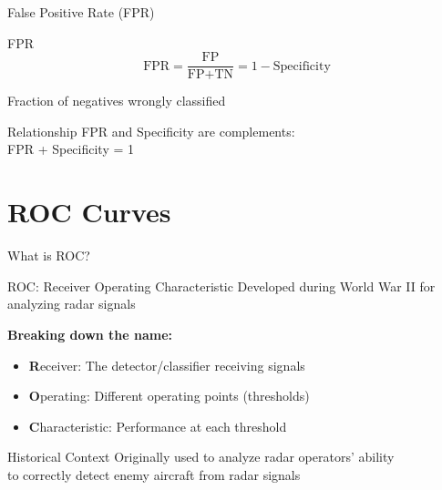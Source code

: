 \documentclass{beamer}
\begin{document}
\begin{frame}{False Positive Rate (FPR)}
\begin{definitionbox}{FPR}
\small
$$\text{FPR} = \frac{\text{FP}}{\text{FP} + \text{TN}} = 1 - \text{Specificity}$$

\vspace{0.15cm}

Fraction of negatives wrongly classified
\end{definitionbox}

\vspace{0.2cm}

\begin{keypointsbox}{Relationship}
\small
FPR and Specificity are complements: \\
FPR + Specificity = 1
\end{keypointsbox}
\end{frame}

\section{ROC Curves}

\begin{frame}{What is ROC?}
\begin{definitionbox}{ROC: Receiver Operating Characteristic}
\small
Developed during World War II for analyzing radar signals

\vspace{0.15cm}

\textbf{Breaking down the name:}
\begin{itemize}
    \item \textbf{R}eceiver: The detector/classifier receiving signals
    \item \textbf{O}perating: Different operating points (thresholds)
    \item \textbf{C}haracteristic: Performance at each threshold
\end{itemize}
\end{definitionbox}

\vspace{0.15cm}

\begin{keypointsbox}{Historical Context}
\small
Originally used to analyze radar operators' ability \\
to correctly detect enemy aircraft from radar signals
\end{keypointsbox}
\end{frame}
\end{document}
